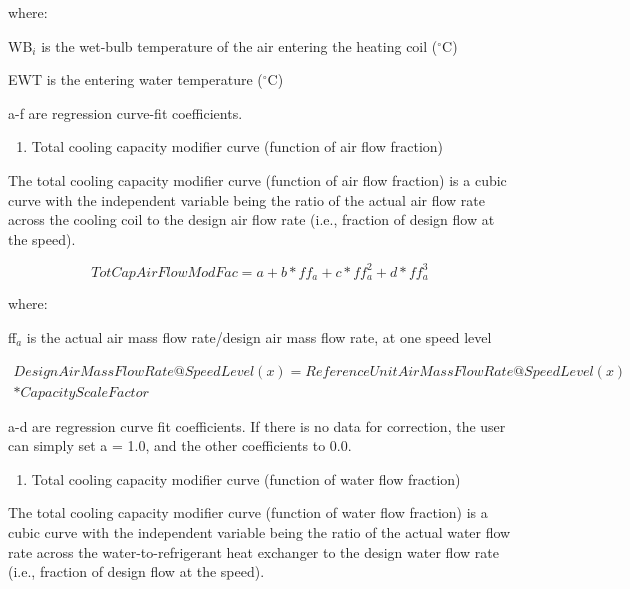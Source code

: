 where:

WB\(_{i}\) is the wet-bulb temperature of the air entering the heating coil (\(^{\circ}\)C)

EWT is the entering water temperature (\(^{\circ}\)C)

a-f are regression curve-fit coefficients.

\begin{enumerate}
\def\labelenumi{\arabic{enumi})}
\setcounter{enumi}{1}
\item Total cooling capacity modifier curve (function of air flow fraction)
\end{enumerate}

The total cooling capacity modifier curve (function of air flow fraction) is a cubic curve with the independent variable being the ratio of the actual air flow rate across the cooling coil to the design air flow rate (i.e., fraction of design flow at the speed).

\begin{equation}
TotCapAirFlowModFac = a + b*f{f_a} + c*ff_a^2 + d*ff_a^3
\end{equation}

where:

ff\(_{a}\) is the actual air mass flow rate/design air mass flow rate, at one speed level

\begin{equation}
\begin{split}
  DesignAirMassFlowRate@SpeedLevel(x) = ReferenceUnitAirMassFlowRate@SpeedLevel(x) \\
  * CapacityScaleFactor
\end{split}
\end{equation}

a-d are regression curve fit coefficients.  If there is no data for correction, the user can simply set a = 1.0, and the other coefficients to 0.0.

\begin{enumerate}
\def\labelenumi{\arabic{enumi})}
\setcounter{enumi}{2}
\item Total cooling capacity modifier curve (function of water flow fraction)
\end{enumerate}

The total cooling capacity modifier curve (function of water flow fraction) is a cubic curve with the independent variable being the ratio of the actual water flow rate across the water-to-refrigerant heat exchanger to the design water flow rate (i.e., fraction of design flow at the speed).

